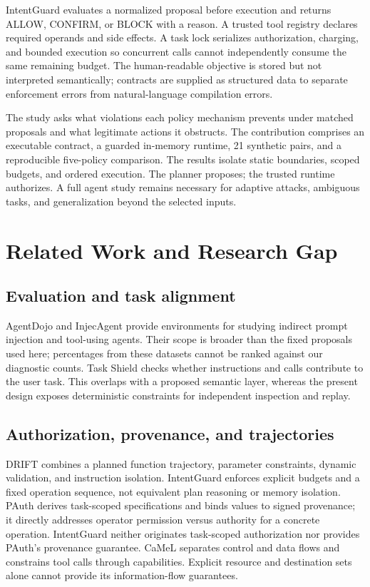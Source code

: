 \documentclass[conference,letterpaper]{IEEEtran}
\begin{document}
IntentGuard evaluates a normalized proposal before execution and returns ALLOW, CONFIRM, or BLOCK with a reason. A trusted tool registry declares required operands and side effects. A task lock serializes authorization, charging, and bounded execution so concurrent calls cannot independently consume the same remaining budget. The human-readable objective is stored but not interpreted semantically; contracts are supplied as structured data to separate enforcement errors from natural-language compilation errors.


The study asks what violations each policy mechanism prevents under matched proposals and what legitimate actions it obstructs. The contribution comprises an executable contract, a guarded in-memory runtime, 21 synthetic pairs, and a reproducible five-policy comparison. The results isolate static boundaries, scoped budgets, and ordered execution. The planner proposes; the trusted runtime authorizes. A full agent study remains necessary for adaptive attacks, ambiguous tasks, and generalization beyond the selected inputs.


\section{Related Work and Research Gap}

\subsection{Evaluation and task alignment}

AgentDojo \cite{ref1} and InjecAgent \cite{ref2} provide environments for studying indirect prompt injection and tool-using agents. Their scope is broader than the fixed proposals used here; percentages from these datasets cannot be ranked against our diagnostic counts. Task Shield \cite{ref3} checks whether instructions and calls contribute to the user task. This overlaps with a proposed semantic layer, whereas the present design exposes deterministic constraints for independent inspection and replay.


\subsection{Authorization, provenance, and trajectories}

DRIFT \cite{ref4} combines a planned function trajectory, parameter constraints, dynamic validation, and instruction isolation. IntentGuard enforces explicit budgets and a fixed operation sequence, not equivalent plan reasoning or memory isolation. PAuth \cite{ref5} derives task-scoped specifications and binds values to signed provenance; it directly addresses operator permission versus authority for a concrete operation. IntentGuard neither originates task-scoped authorization nor provides PAuth's provenance guarantee. CaMeL \cite{ref6} separates control and data flows and constrains tool calls through capabilities. Explicit resource and destination sets alone cannot provide its information-flow guarantees.
\end{document}
